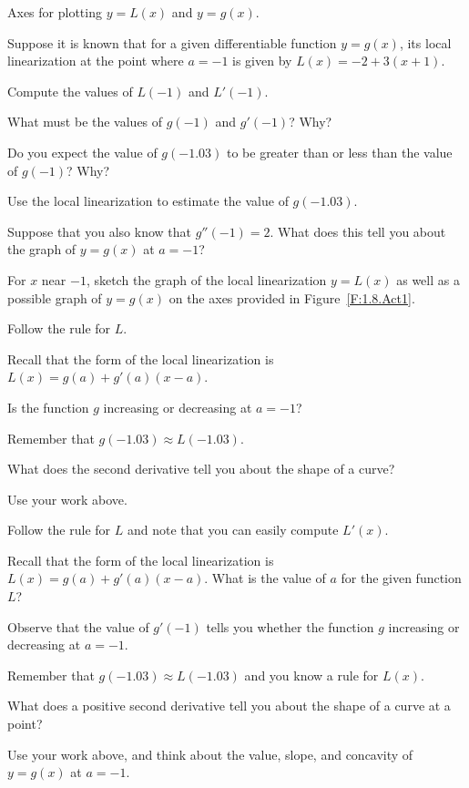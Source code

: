 \begin{marginfigure}[6cm]
\caption{Axes for plotting $y = L(x)$ and $y = g(x)$.} \label{F:1.8.Act1}
\end{marginfigure}

\begin{activity} \label{A:3.6.1}
Suppose it is known that for a given differentiable function $y = g(x)$, its local linearization at the point where $a = -1$ is given by $L(x) = -2 + 3(x+1)$.
\ba
	\item Compute the values of $L(-1)$ and $L'(-1)$.
	\item What must be the values of $g(-1)$ and $g'(-1)$?  Why?
	\item Do you expect the value of $g(-1.03)$ to be greater than or less than the value of $g(-1)$?  Why?
	\item Use the local linearization to estimate the value of $g(-1.03)$.
	\item Suppose that you also know that $g''(-1) = 2.$  What does this tell you about the graph of $y = g(x)$ at $a = -1$?
	\item For $x$ near $-1$, sketch the graph of the local linearization $y = L(x)$ as well as a possible graph of $y = g(x)$ on the axes provided in Figure~\ref{F:1.8.Act1}.
\ea

\end{activity}

\begin{smallhint}
\ba
	\item Follow the rule for $L$.
	\item Recall that the form of the local linearization is $L(x) = g(a) + g'(a)(x-a)$.
	\item Is the function $g$ increasing or decreasing at $a = -1$?
	\item Remember that $g(-1.03) \approx L(-1.03)$.
	\item What does the second derivative tell you about the shape of a curve?
	\item Use your work above.
\ea
\end{smallhint}

\begin{bighint}
\ba
	\item Follow the rule for $L$ and note that you can easily compute $L'(x)$.
	\item Recall that the form of the local linearization is $L(x) = g(a) + g'(a)(x-a)$.  What is the value of $a$ for the given function $L$?
	\item Observe that the value of $g'(-1)$ tells you whether the function $g$ increasing or decreasing at $a = -1$.
	\item Remember that $g(-1.03) \approx L(-1.03)$ and you know a rule for $L(x)$.
	\item What does a positive second derivative tell you about the shape of a curve at a point?
	\item Use your work above, and think about the value, slope, and concavity of $y = g(x)$ at $a = -1$.
\ea
\end{bighint}




\aftera